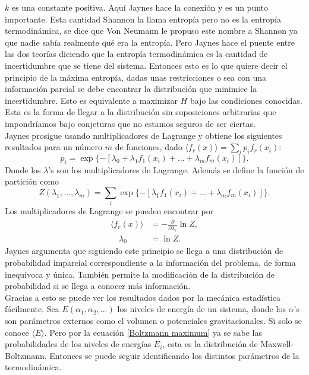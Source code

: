 $k$ es una constante positiva. Aquí Jaynes hace la conexión y es un punto importante. Esta cantidad Shannon la llama entropía pero no es la entropía termodinámica, se dice que Von Neumann le propuso este nombre a Shannon ya que nadie sabía realmente qué era la entropía. Pero Jaynes hace el puente entre las dos teorías diciendo que la entropía termodinámica es la  cantidad de incertidumbre que se tiene del sistema. Entonces esto es lo que quiere decir el principio de la máxima entropía, dadas unas restricciones o sea con una información parcial se debe encontrar la distribución que minimice la incertidumbre. Esto es equivalente a maximizar $H$ bajo las condiciones conocidas. Esta es la forma de llegar a la distribución sin suposiciones arbitrarias que impondríamos bajo conjeturas que no estamos seguros de ser ciertas. 
\\
Jaynes prosigue usando multiplicadores de Lagrange y obtiene los siguientes resultados para un número $m$ de funciones, dado  $\langle f_{r}(x) \rangle = \sum_{i} p_{i} f_{r} (x_{i})$:
\begin{equation} \label{Boltzmann maximum}
p_{i}= \exp \{ -[\lambda_{0}+ \lambda_{1}f_{1}(x_{i})+...+\lambda_{m} f_{m}(x_{i})] \}.
\end{equation}
Donde los $\lambda$'s son los multiplicadores de Lagrange. Además se define la función de partición como
\begin{equation}
Z(\lambda_{1},...,\lambda_{m})=\sum_{i} \exp \{ -[ \lambda_{1}f_{1}(x_{i})+...+\lambda_{m} f_{m}(x_{i})] \}.
\end{equation}
Los multiplicadores de Lagrange se pueden encontrar por
\begin{align*}
\langle f_{r}(x) \rangle  &= - \frac{\partial}{\partial \lambda_{r}} \ln Z, \\
\quad \lambda_{0} &= \ln Z.
\end{align*}
Jaynes argumenta que siguiendo este principio se llega a una distribución de probabilidad imparcial correspondiente a la información del problema, de forma inequívoca y única. También permite la modificación de la distribución de probabilidad si se llega a conocer más información.
\\
Gracias a esto se puede ver los resultados dados por la mecánica estadística fácilmente. Sea $E(\alpha_{1},\alpha_{2},...)$ los niveles de energía de un sistema, donde los $\alpha$'s son parámetros externos como el volumen o potenciales gravitacionales. Si solo se conoce $\langle E \rangle $. Pero por la ecuación \ref{Boltzmann maximum} ya se sabe las probabilidades de los niveles de energías $E_{i}$, esta es la distribución de Maxwell-Boltzmann. Entonces se puede seguir identificando los distintos parámetros de la termodinámica.
